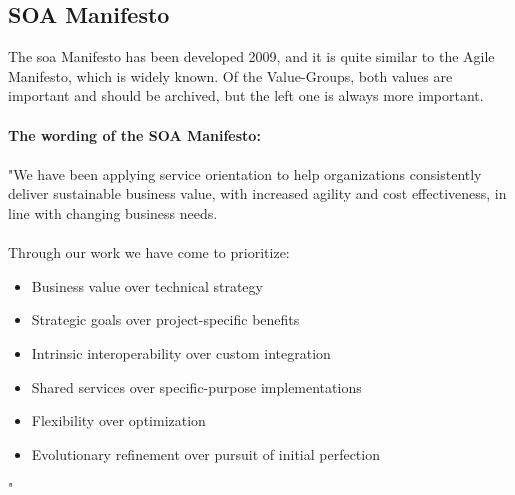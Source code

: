 \documentclass[12pt]{article}
\begin{document}
\subsection{SOA Manifesto}
The \gls{soa} Manifesto has been developed 2009, and it is quite similar to the Agile Manifesto, which is widely known. Of the Value-Groups, both values are important and should be archived, but the left one is always more important. \\ \\
\textbf{The wording of the SOA Manifesto:}\\ \\ 
"We have been applying service orientation to help organizations 
consistently deliver sustainable business value, with increased agility
and cost effectiveness, in line with changing business needs. \\ \\
Through our work we have come to prioritize: \\
\begin{itemize}
\item Business value over technical strategy 
\item Strategic goals over project-specific benefits 
\item Intrinsic interoperability over custom integration 
\item Shared services over specific-purpose implementations 
\item Flexibility over optimization
\item Evolutionary refinement over pursuit of initial perfection
\end{itemize}" \cite{soamaifesto} \newpage
\end{document}

